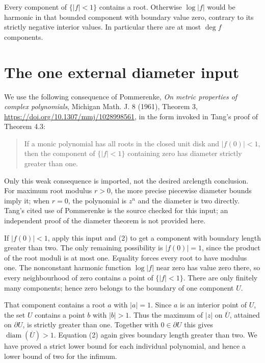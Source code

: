 \documentclass[11pt]{article}
\begin{document}
Every component of $\{|f|<1\}$ contains a root. Otherwise $\log|f|$ would be harmonic in that bounded component with boundary value zero, contrary to its strictly negative interior values. In particular there are at most $\deg f$ components.

\section*{The one external diameter input}
We use the following consequence of Pommerenke, \emph{On metric properties of complex polynomials}, Michigan Math. J. 8 (1961), Theorem 3, \url{https://doi.org/10.1307/mmj/1028998561}, in the form invoked in Tang's proof of Theorem 4.3:
\begin{quote}
If a monic polynomial has all roots in the closed unit disk and $|f(0)|<1$, then the component of $\{|f|<1\}$ containing zero has diameter strictly greater than one.
\end{quote}
Only this weak consequence is imported, not the desired arclength conclusion. For maximum root modulus $r>0$, the more precise piecewise diameter bounds imply it; when $r=0$, the polynomial is $z^n$ and the diameter is two directly. Tang's cited use of Pommerenke is the source checked for this input; an independent proof of the diameter theorem is not provided here.

If $|f(0)|<1$, apply this input and (2) to get a component with boundary length greater than two. The only remaining possibility is $|f(0)|=1$, since the product of the root moduli is at most one. Equality forces every root to have modulus one. The nonconstant harmonic function $\log|f|$ near zero has value zero there, so every neighbourhood of zero contains a point of $\{|f|<1\}$. There are only finitely many components; hence zero belongs to the boundary of one component $U$.

That component contains a root $a$ with $|a|=1$. Since $a$ is an interior point of $U$, the set $U$ contains a point $b$ with $|b|>1$. Thus the maximum of $|z|$ on $\overline U$, attained on $\partial U$, is strictly greater than one. Together with $0\in\partial U$ this gives $\operatorname{diam}(\overline U)>1$. Equation (2) again gives boundary length greater than two. We have proved a strict lower bound for each individual polynomial, and hence a lower bound of two for the infimum.
\end{document}
